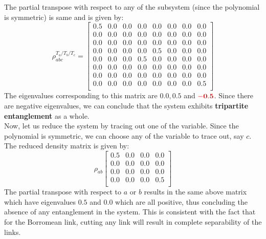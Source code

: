 \documentclass{scrartcl}
\begin{document}
    The partial transpose with respect to any of the subsystem (since the polynomial is symmetric) is same and is given by:
    \begin{equation*}
        \rho^{T_a/T_b/T_c}_{abc} =
        \left[
        \begin{array}{cccccccc}
        0.5 & 0.0 & 0.0 & 0.0 & 0.0 & 0.0 & 0.0 & 0.0 \\
        0.0 & 0.0 & 0.0 & 0.0 & 0.0 & 0.0 & 0.0 & 0.0 \\
        0.0 & 0.0 & 0.0 & 0.0 & 0.0 & 0.0 & 0.0 & 0.0 \\
        0.0 & 0.0 & 0.0 & 0.0 & 0.5 & 0.0 & 0.0 & 0.0 \\
        0.0 & 0.0 & 0.0 & 0.5 & 0.0 & 0.0 & 0.0 & 0.0 \\
        0.0 & 0.0 & 0.0 & 0.0 & 0.0 & 0.0 & 0.0 & 0.0 \\
        0.0 & 0.0 & 0.0 & 0.0 & 0.0 & 0.0 & 0.0 & 0.0 \\
        0.0 & 0.0 & 0.0 & 0.0 & 0.0 & 0.0 & 0.0 & 0.5 \\
        \end{array}
        \right]
        \end{equation*}
        The eigenvalues corresponding to this matrix are $0.0, 0.5$ and $\mathbf{\mathbf{\mathcolor{red}{-0.5}}}$. Since there are negative eigenvalues, we can conclude that the system exhibits \textbf{tripartite entanglement} as a whole.\\[0.3cm]
        Now, let us reduce the system by tracing out one of the variable. Since the polynomial is symmetric, we can choose any of the variable to trace out, say $c$. The reduced density matrix is given by:
        \begin{equation*}
            \rho_{ab}
            \left[
            \begin{array}{cccc}
            0.5 & 0.0 & 0.0 & 0.0 \\
            0.0 & 0.0 & 0.0 & 0.0 \\
            0.0 & 0.0 & 0.0 & 0.0 \\
            0.0 & 0.0 & 0.0 & 0.5 \\
            \end{array}
            \right]
            \end{equation*} 
            The partial transpose with respect to $a$ or $b$ results in the same above matrix which have eigenvalues $0.5$ and $0.0$ which are all positive, thus concluding the absence of any entanglement in the system. This is consistent with the fact that for the Borromean link, cutting any link will result in complete separability of the links. \\[0.3cm]
\end{document}
